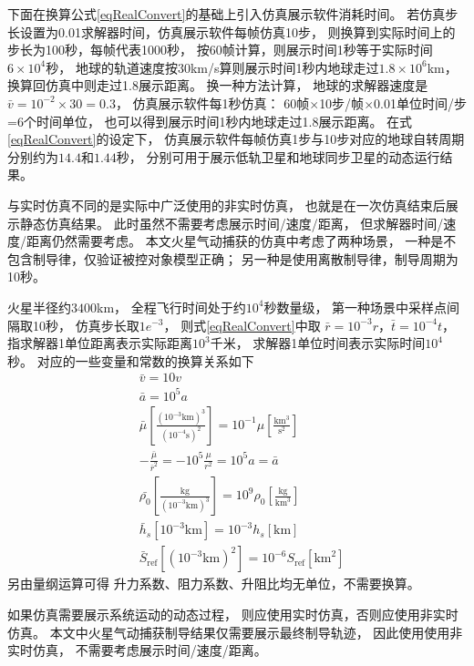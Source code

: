 下面在换算公式\eqref{eqRealConvert}的基础上引入仿真展示软件消耗时间。
若仿真步长设置为0.01求解器时间，仿真展示软件每帧仿真10步，
则换算到实际时间上的步长为100秒，每帧代表1000秒，
按60帧计算，则展示时间1秒等于实际时间$6\times10^4$秒，
地球的轨道速度按30km/s算则展示时间1秒内地球走过$1.8\times10^6$km，
换算回仿真中则走过1.8展示距离。
换一种方法计算，
地球的求解器速度是$\bar{v}=10^{-2}\times30=0.3$，
仿真展示软件每1秒仿真：
60帧$\times$10步/帧$\times$0.01单位时间/步=6个时间单位，
也可以得到展示时间1秒内地球走过1.8展示距离。
在式\eqref{eqRealConvert}的设定下，
仿真展示软件每帧仿真1步与10步对应的地球自转周期分别约为$14.4$和$1.44$秒，
分别可用于展示低轨卫星和地球同步卫星的动态运行结果。

与实时仿真不同的是实际中广泛使用的非实时仿真，
也就是在一次仿真结束后展示静态仿真结果。
此时虽然不需要考虑展示时间/速度/距离，
但求解器时间/速度/距离仍然需要考虑。
本文火星气动捕获的仿真中考虑了两种场景，
一种是不包含制导律，仅验证被控对象模型正确；
另一种是使用离散制导律，制导周期为10秒。

火星半径约$3400$km，
全程飞行时间处于约$10^4$秒数量级，
第一种场景中采样点间隔取10秒，
仿真步长取$1e^{-3}$，
则式\eqref{eqRealConvert}中取
$\bar{r}=10^{-3}r$，$\bar{t}=10^{-4}t$，
指求解器1单位距离表示实际距离$10^3$千米，
求解器1单位时间表示实际时间$10^4$秒。
对应的一些变量和常数的换算关系如下
\begin{align*}
    &\bar{v} = 10v \\
    &\bar{a} = 10^5a \\
    &\bar{\mu}\left[\frac{(10^{-3}\text{km})^3}{(10^{-4}\text{s})^2}\right]
     = 10^{-1}\mu\left[\frac{\text{km}^3}{\text{s}^2}\right] \\
    &-\frac{\bar{\mu}}{\bar{r}^2} = -10^5\frac{\mu}{r^2} = 10^5a = \bar{a} \\
    &\bar{\rho_0}\left[\frac{\text{kg}}{(10^{-3}\text{km})^3}\right]
    = 10^9\rho_0\left[\frac{\text{kg}}{\text{km}^3}\right] \\
    &\bar{h}_s[10^{-3}\text{km}] = 10^{-3}h_s[\text{km}] \\
    &\bar{S}_\text{ref}[(10^{-3}\text{km})^2] = 10^{-6}S_\text{ref}[\text{km}^2]
\end{align*}
另由量纲运算可得
升力系数、阻力系数、升阻比均无单位，不需要换算。

如果仿真需要展示系统运动的动态过程，
则应使用实时仿真，否则应使用非实时仿真。
本文中火星气动捕获制导结果仅需要展示最终制导轨迹，
因此使用使用非实时仿真，
不需要考虑展示时间/速度/距离。

